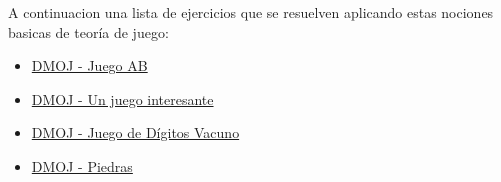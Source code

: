 A continuacion una lista de ejercicios que se resuelven aplicando estas nociones basicas de teoría de juego:

\begin{itemize}
	\item \href{https://dmoj.uclv.edu.cu/problem/agame}{DMOJ - Juego AB}
	\item \href{https://dmoj.uclv.edu.cu/problem/intgame}{DMOJ - Un juego interesante}
	\item \href{https://dmoj.uclv.edu.cu/problem/cdgame}{DMOJ - Juego de Dígitos Vacuno}
	\item \href{https://dmoj.uclv.edu.cu/problem/stones}{DMOJ - Piedras}
\end{itemize}